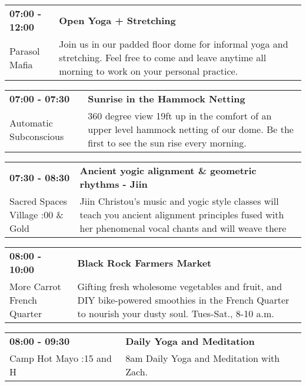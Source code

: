 \begin{tabular}{ p{1in} p{2.2in} }
    \textbf{07:00 - 12:00} & \textbf{Open Yoga + Stretching} \\
    Parasol Mafia \newline  & Join us in our padded floor dome for informal yoga and stretching. Feel free to come and leave anytime all morning to work on your personal practice. \\
    \hline 
\end{tabular}
    
\begin{tabular}{ p{1in} p{2.2in} }
    \textbf{07:00 - 07:30} & \textbf{Sunrise in the Hammock Netting} \\
    Automatic Subconscious \newline  & 360 degree view 19ft up in the comfort of an upper level hammock netting of our dome. Be the first to see the sun rise every morning. \\
    \hline 
\end{tabular}
    
\begin{tabular}{ p{1in} p{2.2in} }
    \textbf{07:30 - 08:30} & \textbf{Ancient yogic alignment \& geometric rhythms - Jiin} \\
    Sacred Spaces Village \newline 4:00 \& Gold & Jiin Christou's  music and yogic style classes will teach you ancient alignment principles fused with her phenomenal vocal chants and will weave there \\
    \hline 
\end{tabular}
    
\begin{tabular}{ p{1in} p{2.2in} }
    \textbf{08:00 - 10:00} & \textbf{Black Rock Farmers Market} \\
    More Carrot \newline French Quarter & Gifting fresh wholesome vegetables and fruit, and DIY bike-powered smoothies in the French Quarter to nourish your dusty soul. Tues-Sat., 8-10 a.m. \\
    \hline 
\end{tabular}
    
\begin{tabular}{ p{1in} p{2.2in} }
    \textbf{08:00 - 09:30} & \textbf{Daily Yoga and Meditation} \\
    Camp Hot Mayo \newline 9:15 and H & 8am Daily Yoga and Meditation with Zach. \\
    \hline 
\end{tabular}
    
